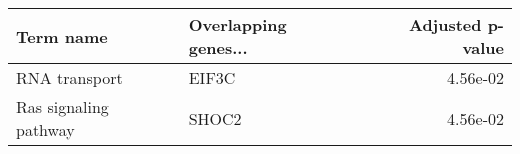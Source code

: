 \begin{tabular}{llr}
\toprule
            Term name & Overlapping genes... &  Adjusted p-value \\
\midrule
        RNA transport &                EIF3C &          4.56e-02 \\
Ras signaling pathway &                SHOC2 &          4.56e-02 \\
\bottomrule
\end{tabular}
